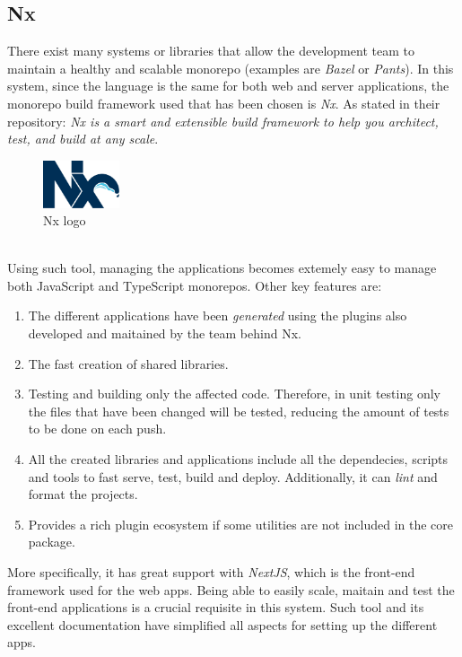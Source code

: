 \documentclass[a4paper, 12pt, oneside]{book}
\begin{document}
\subsection{Nx}
There exist many systems or libraries that allow the development team to maintain a healthy and scalable monorepo (examples are \emph{Bazel} or \emph{Pants}). In this system, since the language is the same for both web and server applications, the monorepo build framework used that has been chosen is \emph{Nx}. As stated in their repository: \emph{Nx is a smart and extensible build framework to help you architect, test, and build at any scale}.
\\
\begin{figure}[h!]
	\centering
	\includegraphics[width=0.2\textwidth]{assets/nx-logo.png}
	\caption{Nx logo}
\end{figure}
\\
Using such tool, managing the applications becomes extemely easy to manage both JavaScript and TypeScript monorepos. Other key features are:
\begin{enumerate}[label = -]
	\item The different applications have been \emph{generated} using the plugins also developed and maitained by the team behind Nx.
	\item The fast creation of shared libraries.
	\item Testing and building only the affected code. Therefore, in unit testing only the files that have been changed will be tested, reducing the amount of tests to be done on each push.
	\item All the created libraries and applications include all the dependecies, scripts and tools to fast serve, test, build and deploy. Additionally, it can \emph{lint} and format the projects.
	\item Provides a rich plugin ecosystem if some utilities are not included in the core package.
\end{enumerate}
More specifically, it has great support with \emph{NextJS}, which is the front-end framework used for the web apps. Being able to easily scale, maitain and test the front-end applications is a crucial requisite in this system. Such tool and its excellent documentation have simplified all aspects for setting up the different apps.
\\[8pt]
\end{document}
